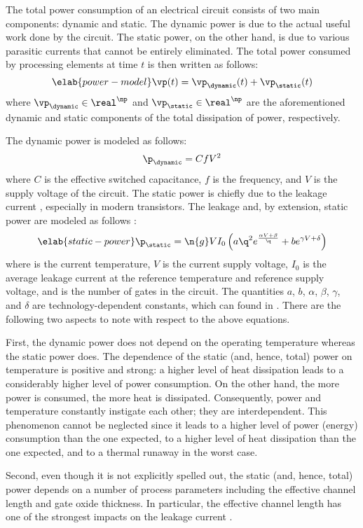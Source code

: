 The total power consumption of an electrical circuit consists of two main
components: dynamic and static. The dynamic power is due to the actual useful
work done by the circuit. The static power, on the other hand, is due to various
parasitic currents that cannot be entirely eliminated. The total power consumed
by \np processing elements at time $t$ is then written as follows:
\begin{equation} \elab{power-model}
  \vp(t) = \vp_\dynamic(t) + \vp_\static(t)
\end{equation}
where $\vp_\dynamic \in \real^\np$ and $\vp_\static \in \real^\np$ are the
aforementioned dynamic and static components of the total dissipation of power,
respectively.

The dynamic power is modeled as follows:
\[
  \p_\dynamic = C f V^2
\]
where $C$ is the effective switched capacitance, $f$ is the frequency, and $V$
is the supply voltage of the circuit. The static power is chiefly due to the
leakage current \cite{chandrakasan2000, srivastava2010, juan2011, juan2012},
especially in modern  transistors. The leakage and, by extension,
static power are modeled as follows \cite{liao2005}:
\begin{equation} \elab{static-power}
  \p_\static = \n{g} V I_0 \left(a \q^2 e^{\frac{\alpha V + \beta}{\q}} + b e^{\gamma V + \delta}\right)
\end{equation}
where \q is the current temperature, $V$ is the current supply voltage, $I_0$ is
the average leakage current at the reference temperature and reference supply
voltage, and  is the number of gates in the circuit. The quantities $a$,
$b$, $\alpha$, $\beta$, $\gamma$, and $\delta$ are technology-dependent
constants, which can found in \cite{liao2005}. There are the following two
aspects to note with respect to the above equations.

First, the dynamic power does not depend on the operating temperature whereas
the static power does. The dependence of the static (and, hence, total) power on
temperature is positive and strong: a higher level of heat dissipation leads to
a considerably higher level of power consumption. On the other hand, the more
power is consumed, the more heat is dissipated. Consequently, power and
temperature constantly instigate each other; they are interdependent. This
phenomenon cannot be neglected since it leads to a higher level of power
(energy) consumption than the one expected, to a higher level of heat
dissipation than the one expected, and to a thermal runaway in the worst case.

Second, even though it is not explicitly spelled out, the static (and, hence,
total) power depends on a number of process parameters including the effective
channel length and gate oxide thickness. In particular, the effective channel
length has one of the strongest impacts on the leakage current \cite{juan2012}.
